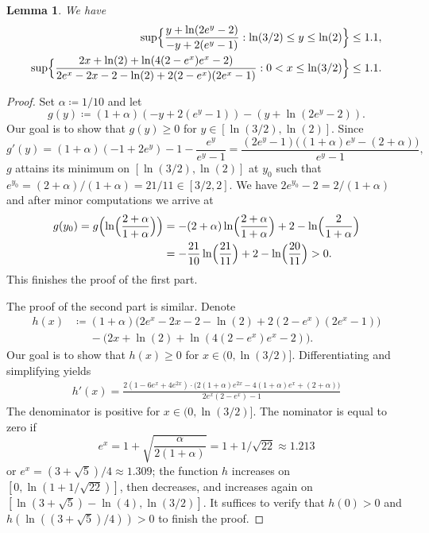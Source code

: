 \documentclass[a4paper]{amsart} %
\newtheorem{lemma}[theorem]{Lemma}
\theoremstyle{definition}
\theoremstyle{remark}
\numberwithin{equation}{section}
\begin{document}
\begin{lemma}
	\label{lem:asymptotic-push-case-0.2.a}
	We have
	\begin{align*}
	\sup\Bigl\{ \frac{y + \ln(2e^y - 2)}{ - y +2(e^y - 1)} : 
	\ln(3/2)\leq y\leq \ln(2) \Bigr\} 
	&\leq 1.1, \\ %
	\sup \Bigl\{ \frac{2 x + \ln(2) + \ln(4 (2 - e^x) e^x - 2)}{2 e^x - 2 x - 2 - \ln(2) + 2 (2 - e^x) (2 e^x - 1)} : 0 < x\leq \ln(3/2) \Bigr\}
	&\leq 1.1. %
	\end{align*}
\end{lemma}

\begin{proof}
	Set $\alpha \coloneqq 1/10$ and let
\[
g(y) \coloneqq (1+\alpha) (- y +2(e^y - 1)) - (y + \ln(2e^y - 2)).
\]
Our goal is to show that $g(y) \geq 0$ for $y\in [\ln(3/2),\ln(2)]$. 
Since
\begin{equation*}
g'(y) = (1 + \alpha)(-1+2e^y) -1 - \frac{e^y}{e^y-1}
=
\frac{(2e^y - 1)\bigl( (1+\alpha) e^y - (2+\alpha)\bigr)}{e^y-1},
\end{equation*}
$g$ attains its minimum on $[\ln(3/2),\ln(2)]$
at $y_0$ such that $e^{y_0} = (2+\alpha)/(1+\alpha) = 21/11 \in[3/2, 2]$.
We have $2e^{y_0}-2 = 2/(1+\alpha)$ 
and after minor computations we arrive at
\begin{align*}
g(y_0) = g\Bigl(\ln \Bigl(\frac{2+\alpha}{1+\alpha}\Bigr) \Bigr)
&= -(2+\alpha)\ln\Bigl(\frac{2+\alpha}{1+\alpha} \Bigr) + 2 - \ln\Bigl(\frac{2}{1+\alpha} \Bigr)\\
& = -\frac{21}{10} \ln\Bigl(\frac{21}{11}\Bigr) + 2 - \ln\Bigl(\frac{20}{11} \Bigr) > 0.\end{align*}
This finishes the proof of the first part.

The proof of the second part is similar.
Denote
\begin{align*}
h(x) &\coloneqq (1+\alpha)\bigl(2 e^x - 2 x - 2 - \ln(2) + 2 (2 - e^x) (2 e^x - 1)\bigr) \\
&\phantom{\coloneqq {}} - \bigl(2 x + \ln(2) + \ln(4 (2 - e^x) e^x - 2)\bigl).
\end{align*}
Our goal is to show that $h(x) \geq 0$ for $x\in (0, \ln(3/2)]$. 
Differentiating and simplifying yields
\begin{align*}
h'(x)  = \frac{2 (1 - 6 e^x + 4 e^{2 x})\cdot \bigl (2(1+\alpha) e^{2x} - 4 (1+\alpha) e^x + (2+\alpha) \bigr)}{2 e^x ( 2- e^x) -1} 
\end{align*}
The denominator is positive for $x\in (0, \ln(3/2)]$.
The nominator is equal to zero 
if 
\[
e^x = 1 + \sqrt{\frac{\alpha}{2(1+\alpha)}} = 1 +  1/ \sqrt{22}\approx 1.213
\]
or  $e^x = (3+\sqrt{5})/4 \approx 1.309$;
the function $h$ increases on $[0, \ln(1+1/\sqrt{22})]$,
 then decreases, 
 and increases again on $[\ln (3+\sqrt{5})- \ln(4), \ln(3/2)]$.
 It suffices to verify that
  $h(0) > 0$ and  $h(\ln((3+\sqrt{5})/4)) >0$ to finish the proof.
\end{proof}
\end{document}
